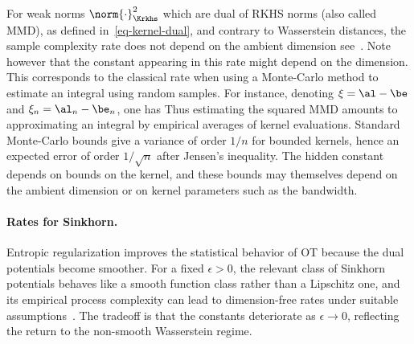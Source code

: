 For weak norms $\norm{\cdot}^2_{\Krkhs}$ which are dual of RKHS norms (also called MMD), as defined in~\eqref{eq-kernel-dual}, and contrary to Wasserstein distances, the sample complexity rate does not depend on the ambient dimension
see~\cite{sriperumbudur2012empirical}. Note however that the constant appearing in this rate might depend on the dimension.
%
This corresponds to the classical rate when using a Monte-Carlo method to estimate an integral using random samples.
%
For instance, denoting $\xi=\al-\be$ and $\xi_n=\al_n-\be_n$, one has
Thus estimating the squared MMD amounts to approximating an integral by empirical averages of kernel evaluations. Standard Monte-Carlo bounds give a variance of order $1/n$ for bounded kernels, hence an expected error of order $1/\sqrt n$ after Jensen's inequality. The hidden constant depends on bounds on the kernel, and these bounds may themselves depend on the ambient dimension or on kernel parameters such as the bandwidth.

%
%


\paragraph{Rates for Sinkhorn.}

Entropic regularization improves the statistical behavior of OT because the dual potentials become smoother. For a fixed $\epsilon>0$, the relevant class of Sinkhorn potentials behaves like a smooth function class rather than a Lipschitz one, and its empirical process complexity can lead to dimension-free rates under suitable assumptions~\cite{genevay2018sample}. The tradeoff is that the constants deteriorate as $\epsilon \rightarrow 0$, reflecting the return to the non-smooth Wasserstein regime.
